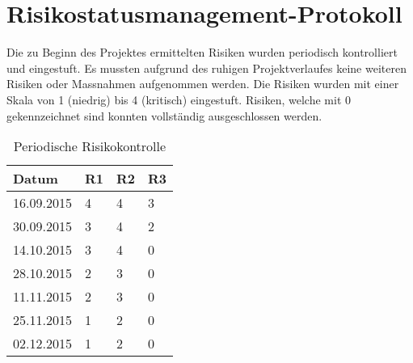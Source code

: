 \section{Risikostatusmanagement-Protokoll}
\label{sec:risk_management}

Die zu Beginn des Projektes ermittelten Risiken wurden periodisch kontrolliert und eingestuft. Es mussten aufgrund des ruhigen Projektverlaufes keine weiteren Risiken oder Massnahmen aufgenommen werden. Die Risiken wurden mit einer Skala von 1 (niedrig) bis 4 (kritisch) eingestuft. Risiken, welche mit 0 gekennzeichnet sind konnten vollständig ausgeschlossen werden.

\begin{table}[H]
\begin{center}
\begin{tabularx}{5.5cm}{ l | l | l | l}
\textbf{Datum} & \textbf{R1} & \textbf{R2} & \textbf{R3} \\ \hline
16.09.2015     & 4           & 4           & 3           \\ \hline
30.09.2015     & 3           & 4           & 2           \\ \hline
14.10.2015     & 3           & 4           & 0           \\ \hline
28.10.2015     & 2           & 3           & 0           \\ \hline
11.11.2015     & 2           & 3           & 0           \\ \hline
25.11.2015     & 1           & 2           & 0           \\ \hline
02.12.2015     & 1           & 2           & 0           \\ \hline
\end{tabularx}
\caption{Periodische Risikokontrolle}
\label{table:risks}
\end{center}
\end{table}
